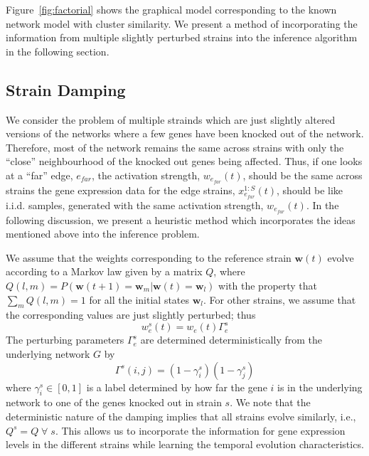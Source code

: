 \documentclass{bioinfo}
\begin{document}
\begin{methods}
Figure~\ref{fig:factorial} shows the graphical model corresponding to
the known network model with cluster similarity. We present a method
of incorporating the information from multiple slightly perturbed
strains into the inference algorithm in the following section. 
 


\subsection{Strain Damping}
\label{sec:strain-damping-model} 
We consider the problem of multiple strainds which are just slightly
altered versions of the networks where a few genes have been knocked out of the
network. Therefore, most of the network remains the same across
strains with only the ``close'' neighbourhood of the knocked out genes
being affected. Thus, if one looks at a ``far'' edge,
$e_{far}$, the activation strength, $w_{e_{far}}(t)$, should be the
same across strains  the gene expression data for the edge strains,
$x^{1:S}_{e_{far}}(t)$, should be like i.i.d. samples, generated with
the same activation strength, $w_{e_{far}}(t)$. In the following discussion, 
we present a heuristic method which incorporates the ideas mentioned
above into the inference problem. 

We assume that the weights corresponding to the reference strain
$\mathbf{w}(t)$ evolve according to a Markov law given by a matrix $Q$,
where $Q(l, m) = P(\mathbf{w}(t+1) = \mathbf{w}_{m} | {\mathbf w}(t)
= \mathbf{w}_{l})$ with the property that $\sum_{m} Q(l, m) = 1$ for
all the initial states $\mathbf{w}_{l}$. For other strains, we assume
that the corresponding values are just slightly perturbed; thus
\begin{equation}
  \label{eq:damping}
 w^s_e(t) = w_e(t) \Gamma^s_e
\end{equation}
The perturbing parameters $\Gamma^s_e$ are determined
deterministically from the underlying network $G$ by
\begin{equation}
  \label{eq:edge-damping}
\Gamma^s(i,j) = (1 - \gamma^s_i)(1 - \gamma^s_j)  
\end{equation}
where $\gamma^s_i \in [0,1]$ is a label determined by how far the gene
$i$ is in the underlying network to one of the genes knocked out in
strain $s$. We note that the deterministic nature of the damping
implies that all strains evolve similarly, i.e., $Q^{s} = Q\;
\forall \; s$. This allows us to incorporate the information for gene
expression levels in the different strains while learning the temporal
evolution characteristics. 


\end{methods}
\end{document}
